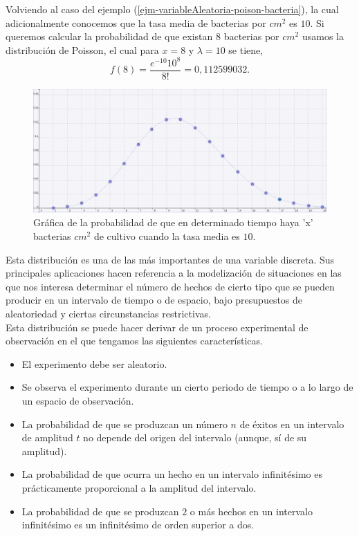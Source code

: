 \begin{Ejm}
    Volviendo al caso del ejemplo (\ref{ejm-variableAleatoria-poison-bacteria}), la cual adicionalmente conocemos que la tasa media de bacterias por $cm^2$ es $10$. Si queremos calcular la probabilidad de que existan $8$ bacterias por $cm^2$ usamos la distribución de Poisson, el cual para $x=8$ y $\lambda = 10$ se tiene,
    $$f(8)=\frac{e^{-10} 10^{8}}{8!}=  0,112599032. $$ 
    \begin{figure}
        \includegraphics[width=15cm]{Cap1-Probabilidad/img/poisson.png}
        \caption{Gráfica de la probabilidad de que en determinado tiempo haya 'x' bacterias $cm^2$ de cultivo cuando la tasa media es $10$.}
    \end{figure}
\end{Ejm}
Esta distribución es una de las más importantes de una variable discreta. Sus principales aplicaciones hacen referencia a la modelización de situaciones en las que nos interesa determinar el número de hechos de cierto tipo que se pueden producir en un intervalo de tiempo o de espacio, bajo presupuestos de aleatoriedad y ciertas circunstancias restrictivas.\\
Esta distribución se puede hacer derivar de un proceso experimental de observación en el que tengamos las siguientes características.
\begin{itemize}
    \item El experimento debe ser aleatorio.
    \item Se observa el experimento durante un cierto periodo de tiempo o a lo largo de un espacio de observación.
    \item La probabilidad de que se produzcan un número $n$ de éxitos en un intervalo de amplitud $t$ no depende del origen del intervalo (aunque, sí de su amplitud).
    \item La probabilidad de que ocurra un hecho en un intervalo infinitésimo es prácticamente proporcional a la amplitud del intervalo.
    \item La probabilidad de que se produzcan $2$ o más hechos en un intervalo infinitésimo es un infinitésimo de orden superior a dos.
\end{itemize}
